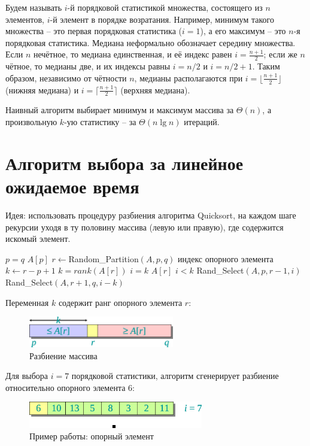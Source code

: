 \documentclass[11pt]{article}
\begin{document}
Будем называть $i$-й порядковой статистикой множества, состоящего из $n$ элементов, $i$-й элемент в порядке возратания. Например, минимум такого множества -- это первая порядковая статистика ($i = 1$), а его максимум -- это $n$-я порядковая статистика. Медиана неформально обозначает середину множества. Если $n$ нечётное, то медиана единственная, и её индекс равен $i = \frac{n+1}{2}$; если же $n$ чётное, то медианы две, и их индексы равны $i=n/2$ и $i=n/2 +1$. Таким образом, независимо от чётности $n$, медианы располагаются при $i = \lfloor \frac{n+1}{2} \rfloor$ (нижняя медиана) и $i = \lceil \frac{n+1}{2} \rceil$ (верхняя медиана).

Наивный алгоритм выбирает минимум и максимум массива за $\Theta(n)$, а произвольную $k$-ую статистику -- за $\Theta(n \lg n)$ итераций.

\section{Алгоритм выбора за линейное ожидаемое время}

Идея: использовать процедуру разбиения алгоритма Quicksort, на каждом шаге рекурсии уходя в ту половину массива (левую или правую), где содержится искомый элемент.
\begin{codebox}
\li \If $p = q$
\li \Then \Return $A[p]$
\li $r \gets $Random\_Partition$(A, p, q)$ \Comment индекс опорного элемента
\li $k \gets r - p + 1$ \Comment $k = rank(A[r])$
\li \If $i = k$
\li \Then \Return $A[r]$
\li \ElseIf $i < k$
\li \Then \Return Rand\_Select$(A, p, r-1, i)$
\li \Else \Return Rand\_Select$(A, r+1, q, i-k)$
  \End
\End
\end{codebox}

Переменная $k$ содержит ранг опорного элемента $r$:
\begin{figure}[ht]
  \centering
  \includegraphics[width=2.5in]{lecture6/partition.eps}
  \caption{Разбиение массива}
  \label{fig:partition}
\end{figure}

Для выбора $i=7$ порядковой статистики, алгоритм сгенерирует разбиение относительно опорного элемента $6$: 
\begin{figure}[ht]
  \centering
  \includegraphics[width=3in]{lecture6/example1.eps}
  \caption{Пример работы: опорный элемент}
  \label{fig:example1}
\end{figure}
\end{document}
